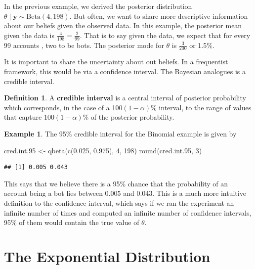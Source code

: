 \documentclass[
]{book}
\newenvironment{Shaded}{\begin{snugshade}}{\end{snugshade}}
\newcommand{\DecValTok}[1]{\textcolor[rgb]{0.00,0.00,0.81}{#1}}
\newcommand{\FloatTok}[1]{\textcolor[rgb]{0.00,0.00,0.81}{#1}}
\newcommand{\FunctionTok}[1]{\textcolor[rgb]{0.00,0.00,0.00}{#1}}
\newcommand{\NormalTok}[1]{#1}
\newcommand{\OtherTok}[1]{\textcolor[rgb]{0.56,0.35,0.01}{#1}}
\theoremstyle{definition}
\newtheorem{definition}{Definition}[chapter]
\theoremstyle{definition}
\newtheorem{example}{Example}[chapter]
\theoremstyle{definition}
\theoremstyle{definition}
\theoremstyle{remark}
\begin{document}
In the previous example, we derived the posterior distribution \(\theta \mid \boldsymbol{y} \sim \textrm{Beta}(4, 198)\). But often, we want to share more descriptive information about our beliefs given the observed data. In this example, the posterior mean given the data is \(\frac{4}{198} = \frac{2}{99}\). That is to say given the data, we expect that for every 99 accounts , two to be bots. The posterior mode for \(\theta\) is \(\frac{3}{200}\) or 1.5\%.

It is important to share the uncertainty about out beliefs. In a frequentist framework, this would be via a confidence interval. The Bayesian analogues is a credible interval.

\begin{definition}
A \textbf{credible interval} is a central interval of posterior probability which corresponds, in the case of a 100\((1-\alpha)\)\% interval, to the range of values that capture 100\((1-\alpha)\)\% of the posterior probability.
\end{definition}

\begin{example}
The 95\% credible interval for the Binomial example is given by

\begin{Shaded}
\begin{Highlighting}[]
\NormalTok{cred.int}\FloatTok{.95} \OtherTok{\textless{}{-}} \FunctionTok{qbeta}\NormalTok{(}\FunctionTok{c}\NormalTok{(}\FloatTok{0.025}\NormalTok{, }\FloatTok{0.975}\NormalTok{), }\DecValTok{4}\NormalTok{, }\DecValTok{198}\NormalTok{)}
\FunctionTok{round}\NormalTok{(cred.int}\FloatTok{.95}\NormalTok{, }\DecValTok{3}\NormalTok{)}
\end{Highlighting}
\end{Shaded}

\begin{verbatim}
## [1] 0.005 0.043
\end{verbatim}

This says that we believe there is a 95\% chance that the probability of an account being a bot lies between 0.005 and 0.043. This is a much more intuitive definition to the confidence interval, which says if we ran the experiment an infinite number of times and computed an infinite number of confidence intervals, 95\% of them would contain the true value of \(\theta\).
\end{example}

\hypertarget{the-exponential-distribution}{%
\section{The Exponential Distribution}\label{the-exponential-distribution}}
\end{document}
